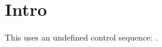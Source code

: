\documentclass{article}
\begin{document}
\section{Intro}\label{sec:intro}
This uses an undefined control sequence: \undefinedcommand.
\end{document}
